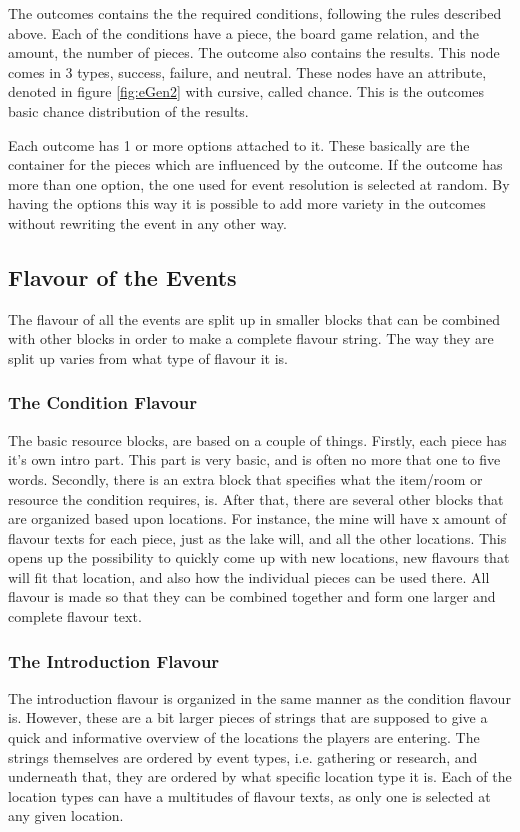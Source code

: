 The outcomes contains the the required conditions, following the rules described above. Each of the conditions have a piece, the board game relation, and the amount, the number of pieces. 
The outcome also contains the results. This node comes in 3 types, success, failure, and neutral. These nodes have an attribute, denoted in figure \ref{fig:eGen2} with cursive, called chance. This is the outcomes basic chance distribution of the results. 

Each outcome has 1 or more options attached to it. These basically are the container for the pieces which are influenced by the outcome. If the outcome has more than one option, the one used for event resolution is selected at random. 
By having the options this way it is possible to add more variety in the outcomes without rewriting the event in any other way.

\subsection{Flavour of the Events}
\label{sec:flav}

The flavour of all the events are split up in smaller blocks that can be combined with other blocks in order to make a complete flavour string. The way they are split up varies from what type of flavour it is.
\subsubsection{The Condition Flavour}
The basic resource blocks, are based on a couple of things. Firstly, each piece has it's own intro part. This part is very basic, and is often no more that one to five words. Secondly, there is an extra block that specifies what the item/room or resource the condition requires, is. After that, there are several other blocks that are organized based upon locations. For instance, the mine will have x amount of flavour texts for each piece, just as the lake will, and all the other locations. This opens up the possibility to quickly come up with new locations, new flavours that will fit that location, and also how the individual pieces can be used there. All flavour is made so that they can be combined together and form one larger and complete flavour text.
\subsubsection{The Introduction Flavour}
The introduction flavour is organized in the same manner as the condition flavour is. However, these are a bit larger pieces of strings that are supposed to give a quick and informative overview of the locations the players are entering. The strings themselves are ordered by event types, i.e. gathering or research, and underneath that, they are ordered by what specific location type it is. Each of the location types can have a multitudes of flavour texts, as only one is selected at any given location.
